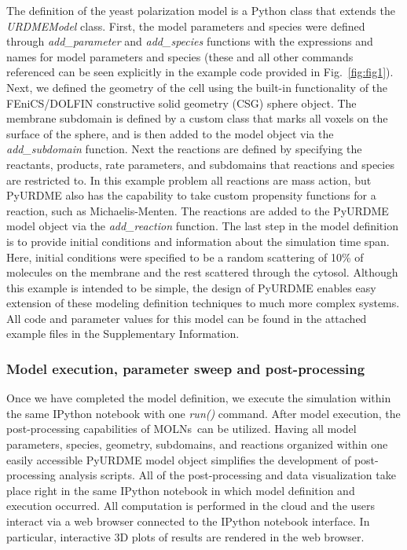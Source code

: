 \documentclass[final,leqno,onefignum,onetabnum]{siamltex1213}
\def\packagename {MOLNs}
\begin{document}
The definition of the yeast polarization model is a Python class that extends the \emph{URDMEModel} class.
First, the model parameters and species were defined through \emph{add\_parameter} and \emph{add\_species} functions with the expressions and names for model parameters and species (these and all other commands referenced can be seen explicitly in the example code provided in Fig.~\ref{fig:fig1}).
Next, we defined the geometry of the cell using the built-in functionality of the FEniCS/DOLFIN \cite{LoggMardalEtAl2012a, dolfin} constructive solid geometry (CSG) sphere object.  
The membrane subdomain is defined by a custom class that marks all voxels on the surface of the sphere, and is then added to the model object via the \emph{add\_subdomain} function.
Next the reactions are defined by specifying the reactants, products, rate parameters, and subdomains that reactions and species are restricted to. In this example problem all reactions are mass action, but PyURDME also has the capability to take custom propensity functions for a reaction, such as Michaelis-Menten. The reactions are added to the PyURDME model object via the \emph{add\_reaction} function.
The last step in the model definition is to provide initial conditions and information about the simulation time span. Here, initial conditions were specified to be a random scattering of 10\% of molecules on the membrane and the rest scattered through the cytosol. 
Although this example is intended to be simple, the design of PyURDME enables easy extension of these modeling definition techniques to much more complex systems. All code and parameter values for this model can be found in the attached example files in the Supplementary Information. 

\subsubsection{Model execution, parameter sweep and post-processing}
Once we have completed the model definition, we execute the simulation within the same IPython notebook with one \emph{run()} command. After model execution, the post-processing capabilities of \packagename~can be utilized. Having all model parameters, species, geometry, subdomains, and reactions organized within one easily accessible PyURDME model object simplifies the development of  post-processing analysis scripts. All of the post-processing and data visualization take place right in the same IPython notebook in which model definition and execution occurred. All computation is performed in the cloud and the users interact via a web browser connected to the IPython notebook interface. In particular, interactive 3D plots of results are rendered in the web browser.
\end{document}
